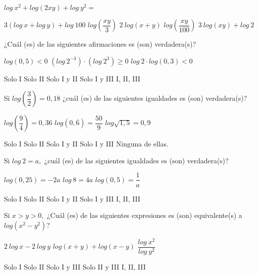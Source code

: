 \documentclass[pagina vacia]{srs}
\begin{document}
\begin{preguntas}
\pregunta $log~x^{2}+log\left(2xy\right)+log~y^{2}=$
\begin{vertical}
\alternativa $3\left(log~x+log~y\right)+log~100$
\alternativa $log\left(\dfrac{xy}{3}\right)$
\alternativa $2~log\left(x+y\right)$
\alternativa $log\left(\dfrac{xy}{100}\right)$
\alternativa $3~log\left(xy\right)+log~2$
\end{vertical}

\pregunta ¿Cuál (es) de las siguientes afirmaciones es (son) verdadera(s)?
\begin{verticali}
\alternativa $log\left(0,5\right)<0$
\alternativa $\left(log~2^{-3}\right)\cdot\left(log~2^{3}\right)\ge0$
\alternativa $log~2\cdot log\left(0,3\right)<0$
\end{verticali}
\begin{vertical}
\alternativa Solo I
\alternativa Solo II
\alternativa Solo I y II
\alternativa Solo I y III
\alternativa I, II, III
\end{vertical}

\pregunta Si $log\left(\dfrac{3}{2}\right)=0,18$ ¿cuál (es) de las siguientes igualdades es (son) verdadera(s)?
\begin{verticali}
\alternativa $log\left(\dfrac{9}{4}\right)=0,36$
\alternativa $log\left(0,\overline{6}\right)=\dfrac{50}{9}$
\alternativa $log\sqrt{1,5}=0,9$
\end{verticali}
\begin{vertical}
\alternativa Solo I
\alternativa Solo II
\alternativa Solo I y II
\alternativa Solo I y III
\alternativa Ninguna de ellas.
\end{vertical}

\pregunta Si $log~2=a,$ ¿cuál (es) de las siguientes igualdades es (son) verdadera(s)?
\begin{verticali}
\alternativa $log\left(0,25\right)=-2a$
\alternativa $log~8=4a$
\alternativa $log\left(0,5\right)=\dfrac{1}{a}$
\end{verticali}
\begin{vertical}
\alternativa Solo I
\alternativa Solo II
\alternativa Solo I y II
\alternativa Solo I y III
\alternativa I, II, III
\end{vertical}

\pregunta Si $x>y>0,$ ¿Cuál (es) de las siguientes expresiones es (son) equivalente(s) a $log\left(x^{2}-y^{2}\right)$?
\begin{verticali}
\alternativa $2~log~x-2~log~y$
\alternativa $log\left(x+y\right)+log\left(x-y\right)$
\alternativa $\dfrac{log~x^{2}}{log~y^{2}}$
\end{verticali}
\begin{vertical}
\alternativa Solo I
\alternativa Solo II
\alternativa Solo I y III
\alternativa Solo II y III
\alternativa I, II, III
\end{vertical}


\end{preguntas}
\end{document}
